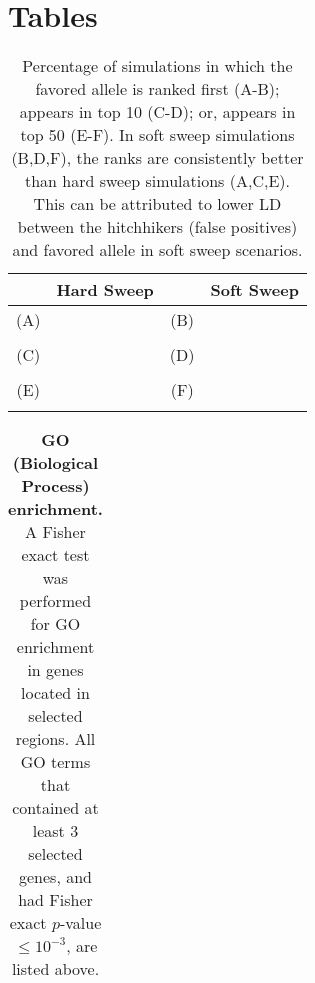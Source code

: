 \section*{Tables}

\begin{table}[H]
	\begin{tabular}{cc|cc}
		& Hard Sweep&  & Soft Sweep\\
		\hline
		(A) & & (B) & \\
		& {}
		& &{ }\\
		\hline
		(C) & & (D) & \\
		& {}
		& &{ }\\
		\hline
		(E) & & (F) & \\
		& {}
		& &{ }\\
		\hline
	\end{tabular}
	\caption{Percentage of simulations in which the favored allele is ranked first 
          (A-B); 
          appears in top 10 (C-D); or,  appears in top 50 (E-F). In soft sweep 
          simulations (B,D,F), the ranks are consistently better than 
          hard sweep simulations (A,C,E). This can be attributed to lower LD between the 
          hitchhikers (false positives) and favored allele in soft sweep scenarios.}\label{tab:rank}
\end{table}



\begin{table}[H]
	\begin{tabular}{c}
		
	\end{tabular}
	\caption{{\bf GO (Biological Process) enrichment.} A Fisher exact test was performed for GO enrichment in genes located in selected regions. All GO terms that contained at least $3$ selected genes, and had Fisher exact $p$-value $\le 10^{-3}$, are listed above.}\label{tab:Fisher2}
\end{table}
